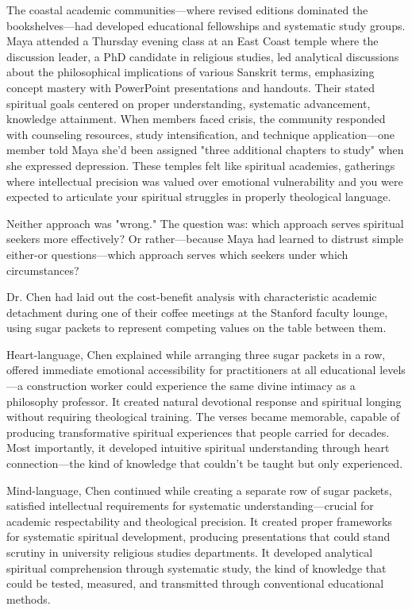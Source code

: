 \documentclass[12pt,twoside]{book}
\begin{document}
The coastal academic communities—where revised editions dominated the bookshelves—had developed educational fellowships and systematic study groups. Maya attended a Thursday evening class at an East Coast temple where the discussion leader, a PhD candidate in religious studies, led analytical discussions about the philosophical implications of various Sanskrit terms, emphasizing concept mastery with PowerPoint presentations and handouts. Their stated spiritual goals centered on proper understanding, systematic advancement, knowledge attainment. When members faced crisis, the community responded with counseling resources, study intensification, and technique application—one member told Maya she'd been assigned "three additional chapters to study" when she expressed depression. These temples felt like spiritual academies, gatherings where intellectual precision was valued over emotional vulnerability and you were expected to articulate your spiritual struggles in properly theological language.

Neither approach was "wrong." The question was: which approach serves spiritual seekers more effectively? Or rather—because Maya had learned to distrust simple either-or questions—which approach serves which seekers under which circumstances?

Dr. Chen had laid out the cost-benefit analysis with characteristic academic detachment during one of their coffee meetings at the Stanford faculty lounge, using sugar packets to represent competing values on the table between them.

Heart-language, Chen explained while arranging three sugar packets in a row, offered immediate emotional accessibility for practitioners at all educational levels—a construction worker could experience the same divine intimacy as a philosophy professor. It created natural devotional response and spiritual longing without requiring theological training. The verses became memorable, capable of producing transformative spiritual experiences that people carried for decades. Most importantly, it developed intuitive spiritual understanding through heart connection—the kind of knowledge that couldn't be taught but only experienced.

Mind-language, Chen continued while creating a separate row of sugar packets, satisfied intellectual requirements for systematic understanding—crucial for academic respectability and theological precision. It created proper frameworks for systematic spiritual development, producing presentations that could stand scrutiny in university religious studies departments. It developed analytical spiritual comprehension through systematic study, the kind of knowledge that could be tested, measured, and transmitted through conventional educational methods.
\end{document}
